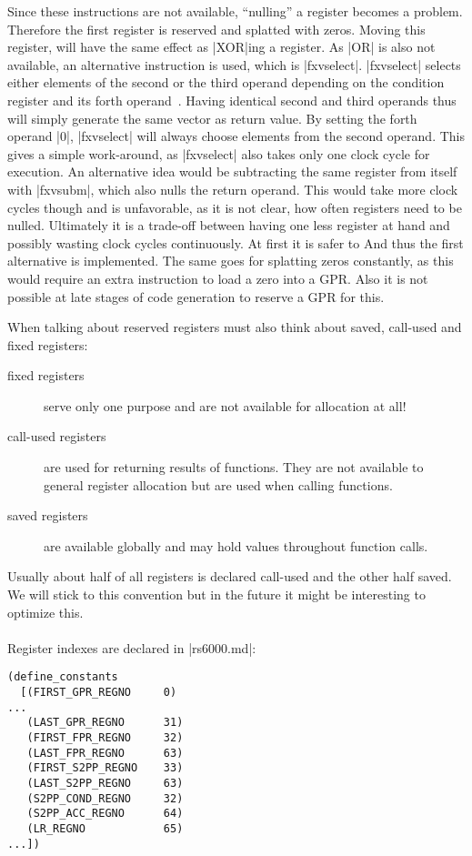 Since these instructions are not available, ``nulling'' a register becomes a problem.
Therefore the first register is reserved and splatted with zeros.
Moving this register, will have the same effect as |XOR|ing a register.
As |OR| is also not available, an alternative instruction is used, which is |fxvselect|.
|fxvselect| selects either elements of the second or the third operand depending on the condition register and its forth operand~\citep[ch.~5]{nuxmanual}.
Having identical second and third operands thus will simply generate the same vector as return value.
By setting the forth operand |0|, |fxvselect| will always choose elements from the second operand.
This gives a simple work-around, as |fxvselect| also takes only one clock cycle for execution.
An alternative idea would be subtracting the same register from itself with |fxvsubm|, which also nulls the return operand.
This would take more clock cycles though and is unfavorable, as it is not clear, how often registers need to be nulled.
Ultimately it is a trade-off between having one less register at hand and possibly wasting clock cycles continuously.
At first it is safer to 
And thus the first alternative is implemented.
The same goes for splatting zeros constantly, as this would require an extra instruction to load a zero into a \ac{GPR}.
Also it is not possible at late stages of code generation to reserve a \ac{GPR} for this.

When talking about reserved registers must also think about saved, call-used and fixed registers:
\begin{description}
    \item[fixed registers] serve only one purpose and are not available for allocation at all!
    \item[call-used registers] are used for returning results of functions. They are not available to general register allocation but are used when calling functions.
    \item[saved registers] are available globally and may hold values throughout function calls.
\end{description}

Usually about half of all registers is declared call-used and the other half saved.
We will stick to this convention but in the future it might be interesting to optimize this.
\\
\\
Register indexes are declared in |rs6000.md|:
\begin{lstlisting}
(define_constants
  [(FIRST_GPR_REGNO     0)
...
   (LAST_GPR_REGNO      31)
   (FIRST_FPR_REGNO     32)
   (LAST_FPR_REGNO      63)
   (FIRST_S2PP_REGNO    33)
   (LAST_S2PP_REGNO     63)
   (S2PP_COND_REGNO     32)
   (S2PP_ACC_REGNO      64)
   (LR_REGNO            65)
...])
\end{lstlisting}

